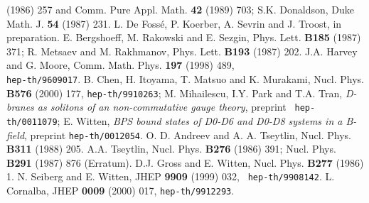 \documentclass[a4paper,12pt,oneside]{article}
\begin{document}
\begin{thebibliography}{99}
(1986) 257 and Comm. Pure Appl. Math. {\bf 42} (1989) 703; S.K. Donaldson, 
Duke Math. J. {\bf 54} (1987) 231.
 L. De Foss\'e, P. Koerber, A. Sevrin and J. Troost, in 
preparation.
 E. Bergshoeff, M. Rakowski and E. Sezgin, Phys. Lett.
{\bf B185} (1987) 371; R. Metsaev and M. Rakhmanov, Phys. Lett.
{\bf B193} (1987) 202.
 J.A. Harvey and G. Moore, Comm. Math. Phys. {\bf 197} (1998) 
489,\\ {\tt hep-th/9609017}.
 B. Chen, H. Itoyama, T. Matsuo and K. Murakami, 
Nucl. Phys. {\bf B576} (2000) 177, {\tt hep-th/9910263}; 
M. Mihailescu, I.Y. Park and T.A. Tran, {\em D-branes as solitons of an \coordHE{}  \coordHE{} non-commutative gauge theory}, preprint {\tt 
hep-th/0011079}; E. Witten, {\em BPS bound states of D0-D6 and D0-D8 
systems in a B-field}, preprint {\tt hep-th/0012054}.
 O. D. Andreev and A. A. Tseytlin, Nucl. Phys. {\bf B311}
(1988) 205.
 A.A. Tseytlin, Nucl. Phys. {\bf B276} (1986) 391; Nucl. 
Phys. {\bf B291} (1987) 876 (Erratum).
 D.J. Gross and E. Witten, Nucl. Phys. {\bf B277} (1986) 1.
 N. Seiberg and E. Witten, JHEP {\bf 9909} (1999) 032, {\tt 
hep-th/9908142}.
 L. Cornalba, JHEP {\bf 0009} (2000) 017,
{\tt hep-th/9912293}.
\end{thebibliography} 
\end{document}
